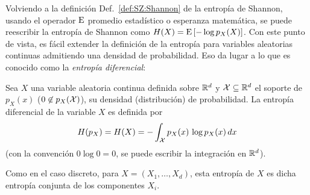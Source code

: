 
\label{sec:SZ:Diferencial}

Volviendo  a  la  definici\'on  Def.~\ref{def:SZ:Shannon} de  la  entrop\'ia  de
Shannon,  usando   el  operador   $\operatorname{E}$  promedio  estad\'istico   o  esperanza
matem\'atica,  se  puede  reescribir  la  entrop\'ia de  Shannon  como  $H(X)  =
\operatorname{E}\left[ - \log p_X(X) \right]$.  Con este punto de vista, es f\'acil extender
la definici\'on de la  entrop\'ia para variables aleatorias continuas admitiendo
una densidad de  probabilidad.  Eso da lugar  a lo que es conocido  como la {\it
  entrop\'ia diferencial}:

\begin{definicion}\label{def:SZ:EntropiaDiferencial}
  Sea  $X$  una variable  aleatoria  continua  definida  sobre $\mathbb{R}^d$  y  $\mathcal{X}
  \subseteq \mathbb{R}^d$ el  soporte de $p_X(x)$ ($0 \not\in  p_X(\mathcal{X})$), su densidad
  (distribuci\'on) de probabilidad. La entrop\'ia diferencial de la variable $X$
  es definida por
  \[
  H(p_X) = H(X) = - \int_{\mathcal{X}} p_X(x) \, \log p_X(x) \, dx
  \]
  (con la  convenci\'on $0 \log  0 = 0$,  se puede escribir la  integraci\'on en
  $\mathbb{R}^d$).
\end{definicion}
%
Como en el caso discreto, para $X = (X_1,\ldots,X_d)$, esta entrop\'ia de $X$ es
dicha entrop\'ia conjunta de los componentes $X_i$.

